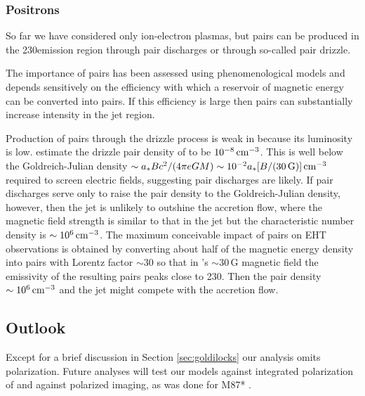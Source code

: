 \subsubsection{Positrons}\label{sec:pair}

So far we have considered only ion-electron plasmas, but pairs can be produced in the 230\GHz emission region through pair discharges or through so-called pair drizzle.

The importance of pairs has been assessed using phenomenological models \citep{2020ApJ...896...30A, 2021ApJ...923..272E} and depends sensitively on the efficiency with which a reservoir of magnetic energy can be converted into pairs.
If this efficiency is large then pairs can substantially increase intensity in the jet region.

Production of pairs through the drizzle process is weak in \sgra because its luminosity is low.
\cite[][see also \citealt{2021ApJ...907...73W}]{2011ApJ...735....9M} estimate the drizzle pair density of \sgra to be $10^{-8}\,\mathrm{cm}^{-3}$.
This is well below the Goldreich-Julian density $\sim a_* B c^2/(4 \pi e G M) \sim 10^{-2} a_* [B/(30\,{\rm G})] \,\mathrm{cm}^{-3}$ required to screen electric fields, suggesting pair discharges are likely.
If pair discharges serve only to raise the pair density to the Goldreich-Julian density, however, then the jet is unlikely to outshine the accretion flow, where the magnetic field strength is similar to that in the jet but the characteristic number density is $\sim 10^6 \,\mathrm{cm}^{-3}$.
The maximum conceivable impact of pairs on EHT observations is obtained by converting about half of the magnetic energy density into pairs with Lorentz factor $\sim 30$ so that in \sgra's $\sim 30$\,G magnetic field the emissivity of the resulting pairs peaks close to 230\GHz.
Then the pair density $\sim 10^{6} \,\mathrm{cm}^{-3}$ and the jet might compete with the accretion flow.

\subsection{Outlook}\label{sec:future}

Except for a brief discussion in Section \ref{sec:goldilocks} our analysis omits polarization.
Future analyses will test our models against integrated polarization of \sgra \citep{2021ApJ...910L..14G} and against polarized imaging, as was done for M87* .


